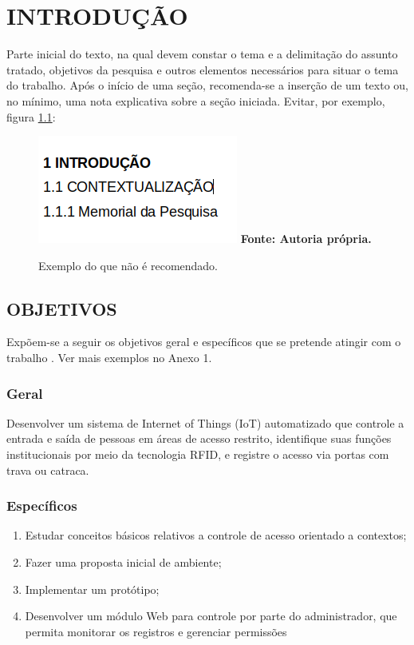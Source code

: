 \chapter{INTRODUÇÃO}\label{chp:INTRODUCAO}

Parte inicial do texto, na qual devem constar o tema e a delimitação do assunto tratado, objetivos da pesquisa e outros elementos necessários para situar o tema do trabalho. Após o início de uma seção, recomenda-se a inserção de um texto ou, no mínimo, uma nota explicativa sobre a seção iniciada. Evitar, por exemplo, figura \ref{fig:WhatNotToDo}:

\begin{figure}[htb]
	\centering
	\caption{Exemplo do que não é recomendado.}
	\includegraphics[scale=0.6]{imagens/what-not-to-do.png} 
	\newline \footnotesize \textbf{Fonte: Autoria própria.}
	\label{fig:WhatNotToDo}
\end{figure}

\section{OBJETIVOS}\label{sec:OBJETIVOS}
Expõem-se a seguir os objetivos geral e específicos que se pretende atingir com o trabalho . Ver mais exemplos no Anexo 1. 

\subsection{Geral}\label{sec:Geral}
Desenvolver um sistema de Internet of Things (IoT) automatizado que controle a entrada e saída de pessoas em áreas de acesso restrito, identifique suas funções institucionais por meio da tecnologia RFID, e registre o acesso via portas com trava ou catraca.


\subsection{Específicos}\label{sec:Especificos}
\begin{enumerate}
	\item Estudar conceitos básicos relativos a controle de acesso orientado a contextos; 
	
	\item Fazer uma proposta inicial de ambiente;
	
	\item Implementar um protótipo;
	
	\item Desenvolver um módulo Web para controle por parte do administrador, que permita monitorar os registros e gerenciar permissões
\end{enumerate}


